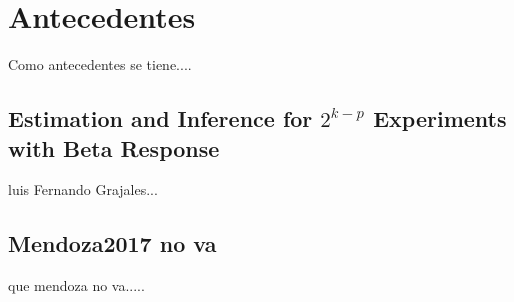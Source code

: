 \chapter{Antecedentes }

Como antecedentes se tiene....

\section{Estimation and Inference for $2^{k-p}$ Experiments with Beta Response}

luis Fernando Grajales...

\section{Mendoza2017 no va}



que mendoza no va.....